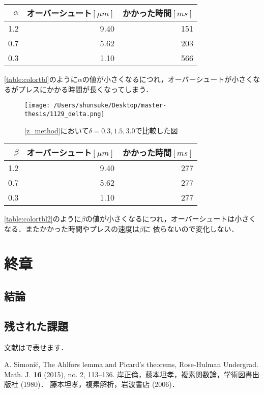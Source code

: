 \documentclass [dvipdfmx] {jsarticle}
\numberwithin{equation}{section}
\theoremstyle{definition} %
\theoremstyle{definition} %
\begin{document}
\begin{table}[h]
    \label{table:colortbl}
    \centering
    \begin{tabular}{|r|r|r|}
     \hline
     $\alpha$ & オーバーシュート$[\mu m]$ & かかった時間$[ms]$  \\
     \hline\hline
     1.2 & 9.40 & 151 \\
     0.7 & 5.62 & 203 \\
     0.3 & 1.10 & 566\\
     \hline
    \end{tabular}
\end{table}
  
\eqref{table:colortbl}のように$\alpha$の値が小さくなるにつれ，オーバーシュートが小さくなるがプレスにかかる時間が長くなってしまう．


\begin{figure}[h]
    \begin{center}
    \texttt{[image: /Users/shunsuke/Desktop/master-thesis/1129\_delta.png]}
    \caption{\eqref{z_method}において$\delta=0.3,1.5,3.0$で比較した図}
    \end{center}
\end{figure}

\begin{table}[h]
    \label{table:colortbl2}
    \centering
    \begin{tabular}{|r|r|r|}
     \hline
     $\beta$ & オーバーシュート$[\mu m]$ & かかった時間$[ms]$  \\
     \hline\hline
     1.2 & 9.40 & 277 \\
     0.7 & 5.62 & 277 \\
     0.3 & 1.10 & 277 \\
     \hline
    \end{tabular}
\end{table}
\eqref{table:colortbl2}のように$\beta$の値が小さくなるにつれ，オーバーシュートは小さくなる．またかかった時間やプレスの速度は$\beta$に
依らないので変化しない．
\section{終章}
\subsection{結論}
\subsection{残された課題}
文献は\cite{Si}で表せます．
\begin{thebibliography}{9}
 A. Simoni\u{c}, The Ahlfors lemma and Picard's theorems, 
Rose-Hulman Undergrad. Math. J. {\bf 16} (2015), no. 2, 113--136. 
 岸正倫，藤本坦孝，複素関数論，学術図書出版社 (1980)．
 藤本坦孝，複素解析，岩波書店 (2006)．


\end{thebibliography}
\end{document}
